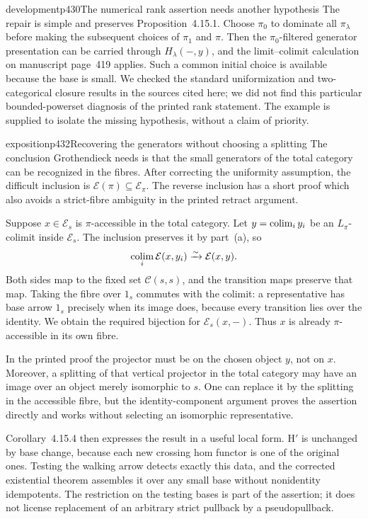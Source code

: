 \begin{dcomment}{development}{p430}{The numerical rank assertion needs another hypothesis}
The repair is simple and preserves Proposition~4.15.1. Choose $\pi_0$ to dominate all $\pi_\lambda$ before making the subsequent choices of $\pi_1$ and $\pi$. Then the $\pi_0$-filtered generator presentation can be carried through $H_\lambda(-,y)$, and the limit--colimit calculation on manuscript page~419 applies. Such a common initial choice is available because the base is small. We checked the standard uniformization and two-categorical closure results in the sources cited here; we did not find this particular bounded-powerset diagnosis of the printed rank statement. The example is supplied to isolate the missing hypothesis, without a claim of priority.
\end{dcomment}

\begin{dcomment}{exposition}{p432}{Recovering the generators without choosing a splitting}
The conclusion Grothendieck needs is that the small generators of the total category can be recognized in the fibres. After correcting the uniformity assumption, the difficult inclusion is $\mathcal E(\pi)\subseteq\mathcal E_\pi$. The reverse inclusion has a short proof which also avoids a strict-fibre ambiguity in the printed retract argument.

Suppose $x\in\mathcal E_s$ is $\pi$-accessible in the total category. Let $y=\mathop{\rm colim}_i y_i$ be an $L_\pi$-colimit inside $\mathcal E_s$. The inclusion preserves it by part~(a), so
\[
 \mathop{\rm colim}_i\mathcal E(x,y_i)
       \xrightarrow{\sim}\mathcal E(x,y).
\]
Both sides map to the fixed set $\mathcal C(s,s)$, and the transition maps preserve that map. Taking the fibre over $1_s$ commutes with the colimit: a representative has base arrow $1_s$ precisely when its image does, because every transition lies over the identity. We obtain the required bijection for $\mathcal E_s(x,-)$. Thus $x$ is already $\pi$-accessible in its own fibre.

In the printed proof the projector must be on the chosen object $y$, not on $x$. Moreover, a splitting of that vertical projector in the total category may have an image over an object merely isomorphic to $s$. One can replace it by the splitting in the accessible fibre, but the identity-component argument proves the assertion directly and works without selecting an isomorphic representative.

Corollary~4.15.4 then expresses the result in a useful local form. H$'$ is unchanged by base change, because each new crossing hom functor is one of the original ones. Testing the walking arrow detects exactly this data, and the corrected existential theorem assembles it over any small base without nonidentity idempotents. The restriction on the testing bases is part of the assertion; it does not license replacement of an arbitrary strict pullback by a pseudopullback.
\end{dcomment}


